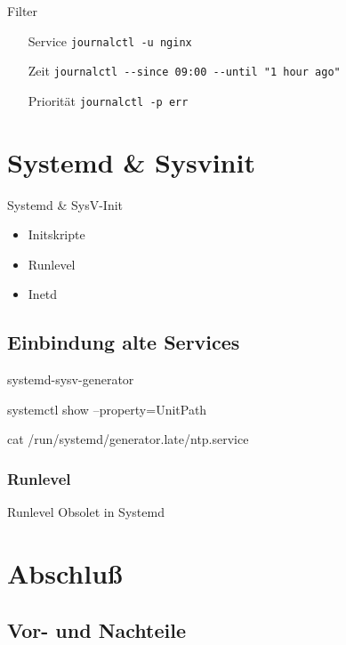 \begin{frame}[fragile]{Filter}
  \begin{itemize}
  \item[Service] \verb|journalctl -u nginx|
  \item[Zeit] \verb|journalctl --since 09:00 --until "1 hour ago"|
  \item[Priorität] \verb|journalctl -p err|
  \end{itemize}
\end{frame}

\section{Systemd \& Sysvinit}

\begin{frame}{Systemd \& SysV-Init}
  \begin{itemize}
  \item Initskripte
  \item Runlevel
  \item Inetd
  \end{itemize}
\end{frame}

\subsection{Einbindung alte Services}

\begin{frame}
systemd-sysv-generator

 systemctl show --property=UnitPath

 cat /run/systemd/generator.late/ntp.service
\end{frame}

 \subsubsection{Runlevel}

\begin{frame}{Runlevel}
 Obsolet in Systemd
\end{frame}

\section{Abschluß}
\subsection{Vor- und Nachteile}

